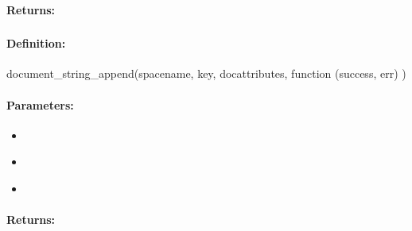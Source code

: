 \paragraph{Returns:}


\pagebreak
\subsubsection{}
\label{api:nodejs:document_string_append}


\paragraph{Definition:}
\begin{javascriptcode}
document_string_append(spacename, key, docattributes, function (success, err) {})
\end{javascriptcode}
\paragraph{Parameters:}
\begin{itemize}[noitemsep]
\item {}\\

\item {}\\

\item {}\\

\end{itemize}

\paragraph{Returns:}


\pagebreak
\subsubsection{}
\label{api:nodejs:map_atomic_add}


